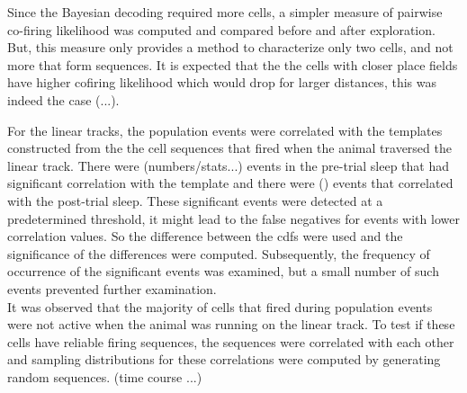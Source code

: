Since the Bayesian decoding required more cells, a simpler measure of pairwise co-firing likelihood was computed and compared before and after exploration. But, this measure only provides a method to characterize only two cells, and not more that form sequences. It is expected that the the cells with closer place fields have higher cofiring likelihood which would drop for larger distances, this was indeed the case (...). 

For the linear tracks, the population events were correlated with the templates constructed from the the cell sequences that fired when the animal traversed the linear track. There were (numbers/stats...) events in the pre-trial sleep that had significant correlation with the template and there were () events that correlated with the post-trial sleep. These significant events were detected at a predetermined threshold, it might lead to the false negatives for events with lower correlation values. So the difference between the cdfs were used and the significance of the differences were computed. Subsequently, the frequency of occurrence of the significant events was examined, but a small number of such events prevented further examination.\\
It was observed that the majority of cells that fired during population events were not active when the animal was running on the linear track. To test if these cells have reliable firing sequences, the sequences were correlated with each other and sampling distributions for these correlations were computed by generating random sequences. (time course ...)
